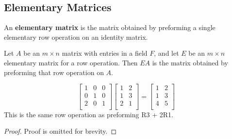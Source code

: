 \documentclass{article}
\begin{document}
\subsection{Elementary Matrices}
\begin{definition}
  An \textbf{elementary matrix} is the matrix obtained by preforming a single elementary row operation on an identity matrix.
\end{definition}
\begin{theorem}
  Let $A$ be an $m \times n$ matrix with entries in a field $F$, and let $E$ be an $m \times n$ elementary matrix for a row operation. Then $EA$ is the matrix obtained by preforming that row operation on $A$.
\end{theorem}
\begin{example}
  \[
    \begin{bmatrix}
      1 & 0 & 0\\
      0 & 1 & 0\\
      2 & 0 & 1\\
    \end{bmatrix}
    \begin{bmatrix}
      1 & 2\\
      1& 3\\
      2 & 1\\
    \end{bmatrix}
    =
    \begin{bmatrix}
      1 & 2\\
      1& 3\\
      4 & 5\\
    \end{bmatrix}
  \]
  This is the same row operation as preforming R3 + 2R1.
\end{example}
\begin{proof}
  Proof is omitted for brevity.
\end{proof}
\end{document}
